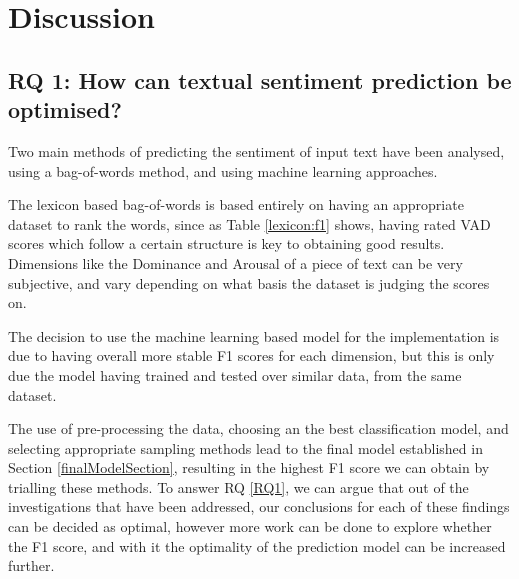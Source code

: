 \section{Discussion} 
\subsection{RQ 1: How can textual sentiment prediction be optimised?}

Two main methods of predicting the sentiment of input text have been analysed, using a bag-of-words method, and using machine learning approaches.

The lexicon based bag-of-words is based entirely on having an appropriate dataset to rank the words, since as Table \ref{lexicon:f1} shows, having rated VAD scores which follow a certain structure is key to obtaining good results. Dimensions like the Dominance and Arousal of a piece of text can be very subjective, and vary depending on what basis the dataset is judging the scores on.

The decision to use the machine learning based model for the implementation is due to having overall more stable F1 scores for each dimension, but this is only due the model having trained and tested over similar data, from the same dataset.

The use of pre-processing the data, choosing an the best classification model, and selecting appropriate sampling methods lead to the final model established in Section \ref{finalModelSection},  resulting in the highest F1 score we can obtain by trialling these methods. To answer RQ \ref{RQ1}, we can argue that out of the investigations that have been addressed, our conclusions for each of these findings can be decided as optimal, however more work can be done to explore whether the F1 score, and with it the optimality of the prediction model can be increased further.

